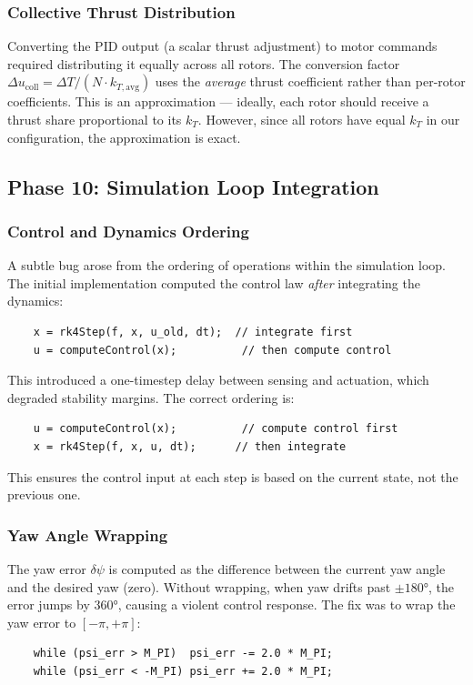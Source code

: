 \documentclass[12pt, a4paper]{article}
\begin{document}
\subsubsection{Collective Thrust Distribution}

Converting the PID output (a scalar thrust adjustment) to motor commands required distributing it equally across all rotors.  The conversion factor $\Delta u_{\text{coll}} = \Delta T / (N \cdot k_{T,\text{avg}})$ uses the \emph{average} thrust coefficient rather than per-rotor coefficients.  This is an approximation --- ideally, each rotor should receive a thrust share proportional to its $k_T$.  However, since all rotors have equal $k_T$ in our configuration, the approximation is exact.

\subsection{Phase 10: Simulation Loop Integration}

\subsubsection{Control and Dynamics Ordering}

A subtle bug arose from the ordering of operations within the simulation loop.  The initial implementation computed the control law \emph{after} integrating the dynamics:
\begin{verbatim}
    x = rk4Step(f, x, u_old, dt);  // integrate first
    u = computeControl(x);          // then compute control
\end{verbatim}
This introduced a one-timestep delay between sensing and actuation, which degraded stability margins.  The correct ordering is:
\begin{verbatim}
    u = computeControl(x);          // compute control first
    x = rk4Step(f, x, u, dt);      // then integrate
\end{verbatim}
This ensures the control input at each step is based on the current state, not the previous one.

\subsubsection{Yaw Angle Wrapping}

The yaw error $\delta\psi$ is computed as the difference between the current yaw angle and the desired yaw (zero).  Without wrapping, when yaw drifts past $\pm 180°$, the error jumps by $360°$, causing a violent control response.  The fix was to wrap the yaw error to $[-\pi, +\pi]$:
\begin{verbatim}
    while (psi_err > M_PI)  psi_err -= 2.0 * M_PI;
    while (psi_err < -M_PI) psi_err += 2.0 * M_PI;
\end{verbatim}
\end{document}
